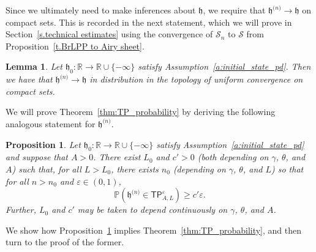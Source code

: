 \documentclass[oneside,final,11pt]{amsart}
\newtheorem{lemma}[thm]{Lemma}
\newtheorem{proposition}[thm]{Proposition}
\theoremstyle{definition}
\newcommand{\fh}{\mathfrak{h}}
\newcommand{\h}{\fh^{{\scriptscriptstyle(}n{\scriptscriptstyle)}}}
\newcommand{\TP}[1]{\mathsf{TP}_{\!\!#1}}
\newcommand{\bJ}{\mathsf{J}}
\newcommand{\R}{\mathbb{R}}
\newcommand{\CS}{\mathcal{S}}
\renewcommand{\S}{\CS}
\newcommand{\1}[1]{\mathbf{1}_{#1}}
\newcommand{\eps}{\varepsilon}
\newcommand{\hlim}{\mathfrak{h}}
\newcommand{\smallconst}{c'}
\renewcommand{\P}{\mathbb P}
\numberwithin{equation}{section}
\begin{document}
Since we ultimately need to make inferences about $\hlim$, we require that $\h\to \hlim$ on compact sets. This is recorded in the next statement, which we will prove in Section~\ref{s.technical estimates} using the convergence of $\S_n$ to $\S$ from Proposition~\ref{t.BrLPP to Airy sheet}.



\begin{lemma}\label{l.convergence to fixed point} Let $\hlim_0:\R\to\R\cup\{-\infty\}$ satisfy Assumption~\ref{a:initial_state_pd}. Then we have that $\h \to \hlim$ in distribution in the topology of uniform convergence on compact sets.
\end{lemma}


We will prove Theorem~\ref{thm:TP_probability} by deriving the following analogous statement for $\h$. %

\begin{proposition}\label{p.twin peaks prelimit}
Let $\hlim_0:\R\to\R\cup\{-\infty\}$ satisfy Assumption~\ref{a:initial_state_pd} and suppose that $A>0$. There exist $L_0$ and $\smallconst>0$ (both depending on $\gamma$, $\theta$, and $A$) such that, for all $L> L_0$, there exists $n_0$ (depending on $\gamma$, $\theta$, and $L$) so that for all $n>n_0$ and $\varepsilon\in(0,1)$,
%
$$\P\left(\h\in\TP{A,L}^{\eps}\right) \geq \smallconst\varepsilon.$$
%
Further, $L_0$ and $\smallconst$ may be taken to depend continuously on $\gamma$, $\theta$, and $A$.
\end{proposition}
%
We show how Proposition~\ref{p.twin peaks prelimit} implies Theorem~\ref{thm:TP_probability}, and then turn to the proof of the former.
\end{document}
